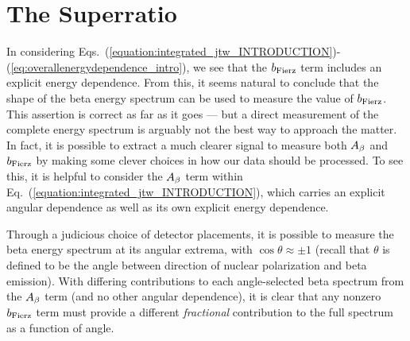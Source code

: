 



\section{The Superratio}
\label{signature_chapter}
In considering Eqs.~(\ref{equation:integrated_jtw_INTRODUCTION})-(\ref{eq:overallenergydependence_intro}), we see that the $b_{\mathrm{Fierz}}$ term includes an explicit energy dependence.  From this, it seems natural to conclude that the shape of the beta energy spectrum can be used to measure the value of $b_{\mathrm{Fierz}}$.  This assertion is correct as far as it goes --- but a direct measurement of the complete energy spectrum is arguably not the best way to approach the matter.  In fact, it is possible to extract a much clearer signal to measure both $A_{\beta}$ and $b_{\mathrm{Fierz}}$ by making some clever choices in how our data should be processed.  
To see this, it is helpful to consider the $A_{\beta}$ term within Eq.~(\ref{equation:integrated_jtw_INTRODUCTION}), which carries an explicit angular dependence as well as its own explicit energy dependence.  

Through a judicious choice of detector placements, it is possible to measure the beta energy spectrum at its angular extrema, with $\cos\theta \approx \pm 1$ (recall that $\theta$ is defined to be the angle between direction of nuclear polarization and beta emission).  
With differing contributions to each angle-selected beta spectrum from the $A_{\beta}$ term (and no other angular dependence), it is clear that any nonzero $b_{\mathrm{Fierz}}$ term must provide a different \emph{fractional} contribution to the full spectrum as a function of angle.

